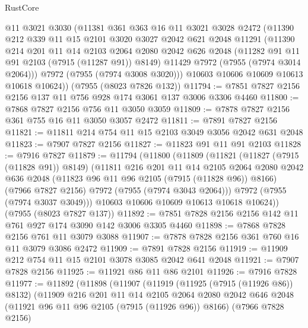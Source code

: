 \begin{lexlean}{RustCore}
\begin{coremodule}
      @11
      @3021
      @3030
      (@11381
        @361
        @363
        @16
        @11
        @3021
        @3028
        @2472
        (@11390
          @212
          @339
          @11
          @15
          @2101
          @3020
          @3027
          @2042
          @621
          @2048
          @11291
          (@11390
            @214
            @201
            @11
            @14
            @2103
            @2064
            @2080
            @2042
            @626
            @2048
            (@11282 @91 @11 @91 @2103 (@7915 (@11287 @91)) @8149)
            @11429
            @7972
            (@7955 (@7974 @3014 @2064)))
          @7972
          (@7955 (@7974 @3008 @3020)))
        @10603
        @10606
        @10609
        @10613
        @10618
        @10624))
    (@7955 (@8023 @7826 @132))
@11794 := @7851 @7827 @2156 @2156 @137 @11 @756 @928 @174 @3061 @137 @3006 @3306 @4460
@11800 := @7868 @7827 @2156 @756 @11 @3050 @3059
@11809 := @7878 @7827 @2156 @361 @755 @16 @11 @3050 @3057 @2472
@11811 := @7891 @7827 @2156
@11821 := @11811 @214 @754 @11 @15 @2103 @3049 @3056 @2042 @631 @2048
@11823 := @7907 @7827 @2156
@11827 := @11823 @91 @11 @91 @2103
@11828 := @7916 @7827
@11879 := @11794
    (@11800
      (@11809
        (@11821
          (@11827 (@7915 (@11828 @91)) @8149)
          (@11811
            @216
            @201
            @11
            @14
            @2105
            @2064
            @2080
            @2042
            @636
            @2048
            (@11823 @96 @11 @96 @2105 (@7915 (@11828 @96)) @8166)
            (@7966 @7827 @2156)
            @7972
            (@7955 (@7974 @3043 @2064)))
          @7972
          (@7955 (@7974 @3037 @3049)))
        @10603
        @10606
        @10609
        @10613
        @10618
        @10624))
    (@7955 (@8023 @7827 @137))
@11892 := @7851 @7828 @2156 @2156 @142 @11 @761 @927 @174 @3090 @142 @3006 @3305 @4460
@11898 := @7868 @7828 @2156 @761 @11 @3079 @3088
@11907 := @7878 @7828 @2156 @361 @760 @16 @11 @3079 @3086 @2472
@11909 := @7891 @7828 @2156
@11919 := @11909 @212 @754 @11 @15 @2101 @3078 @3085 @2042 @641 @2048
@11921 := @7907 @7828 @2156
@11925 := @11921 @86 @11 @86 @2101
@11926 := @7916 @7828
@11977 := @11892
    (@11898
      (@11907
        (@11919
          (@11925 (@7915 (@11926 @86)) @8132)
          (@11909
            @216
            @201
            @11
            @14
            @2105
            @2064
            @2080
            @2042
            @646
            @2048
            (@11921 @96 @11 @96 @2105 (@7915 (@11926 @96)) @8166)
            (@7966 @7828 @2156)

\end{coremodule}
\end{lexlean}

